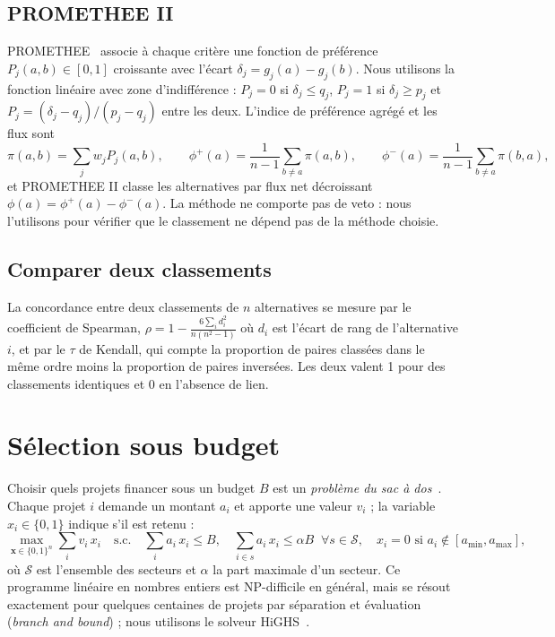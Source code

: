 \subsection{PROMETHEE II}

PROMETHEE~\cite{brans1985} associe à chaque critère une fonction de préférence $P_j(a,b) \in [0,1]$ croissante avec
l'écart $\delta_j = g_j(a) - g_j(b)$. Nous utilisons la fonction linéaire avec zone d'indifférence :
$P_j = 0$ si $\delta_j \leq q_j$, $P_j = 1$ si $\delta_j \geq p_j$ et
$P_j = (\delta_j - q_j)/(p_j - q_j)$ entre les deux. L'indice de préférence agrégé et les flux sont
\begin{equation}
  \pi(a,b) = \sum_j w_j P_j(a,b), \qquad
  \phi^+(a) = \frac{1}{n-1}\sum_{b\neq a}\pi(a,b), \qquad
  \phi^-(a) = \frac{1}{n-1}\sum_{b\neq a}\pi(b,a),
\end{equation}
et PROMETHEE II classe les alternatives par flux net décroissant $\phi(a) = \phi^+(a) - \phi^-(a)$. La méthode ne
comporte pas de veto : nous l'utilisons pour vérifier que le classement ne dépend pas de la méthode choisie.

\subsection{Comparer deux classements}

La concordance entre deux classements de $n$ alternatives se mesure par le coefficient de Spearman,
$\rho = 1 - \frac{6\sum_i d_i^2}{n(n^2-1)}$ où $d_i$ est l'écart de rang de l'alternative $i$, et par le $\tau$ de
Kendall, qui compte la proportion de paires classées dans le même ordre moins la proportion de paires inversées.
Les deux valent 1 pour des classements identiques et 0 en l'absence de lien.

\section{Sélection sous budget}\label{sec:theorie-budget}

Choisir quels projets financer sous un budget $B$ est un \emph{problème du sac à dos}~\cite{martello1990}. Chaque
projet $i$ demande un montant $a_i$ et apporte une valeur $v_i$ ; la variable $x_i \in \{0,1\}$ indique s'il est
retenu :
\begin{equation}
  \max_{\bm{x}\in\{0,1\}^n} \sum_i v_i\,x_i
  \quad\text{s.c.}\quad \sum_i a_i\,x_i \leq B,
  \quad \sum_{i \in s} a_i\,x_i \leq \alpha B \;\; \forall s \in \mathcal{S},
  \quad x_i = 0 \text{ si } a_i \notin [a_{\min}, a_{\max}],
\end{equation}
où $\mathcal{S}$ est l'ensemble des secteurs et $\alpha$ la part maximale d'un secteur. Ce programme linéaire en
nombres entiers est NP-difficile en général, mais se résout exactement pour quelques centaines de projets par
séparation et évaluation (\textit{branch and bound}) ; nous utilisons le solveur HiGHS~\cite{huangfu2018}.

